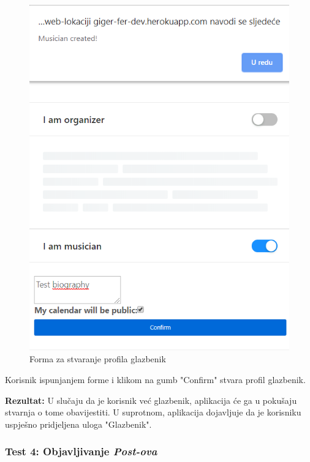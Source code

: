 		\begin{figure}[H]
			\begin{center}
				\includegraphics[width=13cm]{slike/create_musician.PNG}
			\end{center}
			\caption{Forma za stvaranje profila glazbenik}
			\label{fig:inttest}
		\end{figure}
		
		\noindent Korisnik ispunjanjem forme i klikom na gumb "Confirm" stvara profil glazbenik.
		
		\noindent\textbf{Rezultat:} U slučaju da je korisnik već glazbenik, aplikacija će ga u pokušaju stvarnja o tome obavijestiti. U suprotnom, aplikacija dojavljuje da je korisniku uspješno pridjeljena uloga "Glazbenik".
		
		\subsubsection{Test 4: Objavljivanje \textit{Post-ova}}
			
